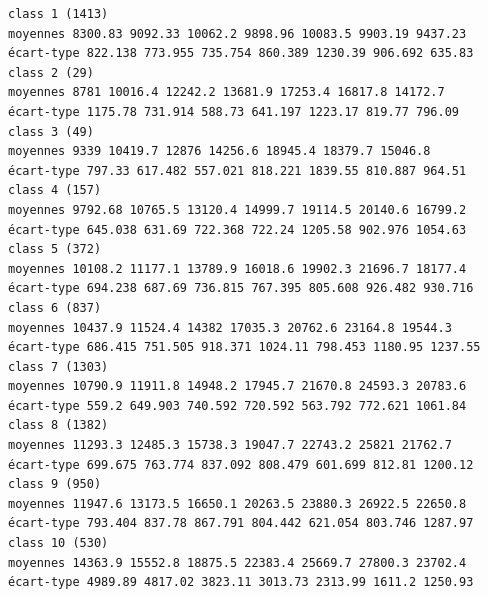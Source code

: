 \documentclass[environments,article,submit,pdftex,moreauthors]{Definitions/mdpi}
\begin{document}
\begin{scriptsize}
\begin{verbatim}
class 1 (1413)
moyennes 8300.83 9092.33 10062.2 9898.96 10083.5 9903.19 9437.23
écart-type 822.138 773.955 735.754 860.389 1230.39 906.692 635.83
class 2 (29)
moyennes 8781 10016.4 12242.2 13681.9 17253.4 16817.8 14172.7
écart-type 1175.78 731.914 588.73 641.197 1223.17 819.77 796.09
class 3 (49)
moyennes 9339 10419.7 12876 14256.6 18945.4 18379.7 15046.8
écart-type 797.33 617.482 557.021 818.221 1839.55 810.887 964.51
class 4 (157)
moyennes 9792.68 10765.5 13120.4 14999.7 19114.5 20140.6 16799.2
écart-type 645.038 631.69 722.368 722.24 1205.58 902.976 1054.63
class 5 (372)
moyennes 10108.2 11177.1 13789.9 16018.6 19902.3 21696.7 18177.4
écart-type 694.238 687.69 736.815 767.395 805.608 926.482 930.716
class 6 (837)
moyennes 10437.9 11524.4 14382 17035.3 20762.6 23164.8 19544.3
écart-type 686.415 751.505 918.371 1024.11 798.453 1180.95 1237.55
class 7 (1303)
moyennes 10790.9 11911.8 14948.2 17945.7 21670.8 24593.3 20783.6
écart-type 559.2 649.903 740.592 720.592 563.792 772.621 1061.84
class 8 (1382)
moyennes 11293.3 12485.3 15738.3 19047.7 22743.2 25821 21762.7
écart-type 699.675 763.774 837.092 808.479 601.699 812.81 1200.12
class 9 (950)
moyennes 11947.6 13173.5 16650.1 20263.5 23880.3 26922.5 22650.8
écart-type 793.404 837.78 867.791 804.442 621.054 803.746 1287.97
class 10 (530)
moyennes 14363.9 15552.8 18875.5 22383.4 25669.7 27800.3 23702.4
écart-type 4989.89 4817.02 3823.11 3013.73 2313.99 1611.2 1250.93


\end{verbatim}
\end{scriptsize}
\end{document}
